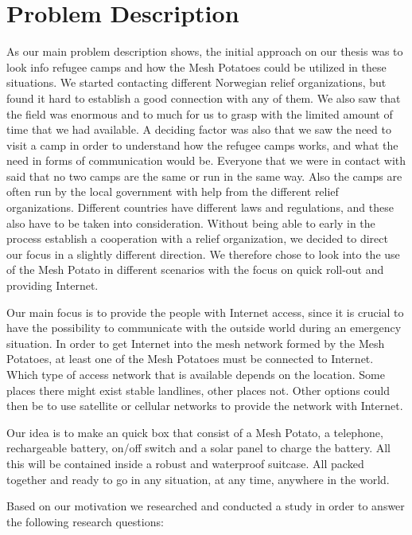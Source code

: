 \section{Problem Description}
As our main problem description shows, the initial approach on our thesis was to look info refugee camps and how the Mesh Potatoes could be utilized in these situations. We started contacting different Norwegian relief organizations, but found it hard to establish a good connection with any of them. We also saw that the field was enormous and to much for us to grasp with the limited amount of time that we had available. A deciding factor was also that we saw the need to visit a camp in order to understand how the refugee camps works, and what the need in forms of communication would be. Everyone that we were in contact with said that no two camps are the same or run in the same way. Also the camps are often run by the local government with help from the different relief organizations. Different countries have different laws and regulations, and these also have to be taken into consideration. Without being able to early in the process establish a cooperation with a relief organization, we decided to direct our focus in a slightly different direction. We therefore chose to look into the use of the Mesh Potato in different scenarios with the focus on quick roll-out and providing Internet.

Our main focus is to provide the people with Internet access, since it is crucial to have the possibility to communicate with the outside world during an emergency situation. In order to get Internet into the mesh network formed by the Mesh Potatoes, at least one of the Mesh Potatoes must be connected to Internet. Which type of access network that is available depends on the location. Some places there might exist stable landlines, other places not. Other options could then be to use satellite or cellular networks to provide the network with Internet.  

Our idea is to make an \gls{quick} box that consist of a Mesh Potato, a telephone, rechargeable battery, on/off switch and a solar panel to charge the battery. All this will be contained inside a robust and waterproof suitcase. All packed together and ready to go in any situation, at any time, anywhere in the world. 

Based on our motivation we researched and conducted a study in order to answer the following research questions: 

